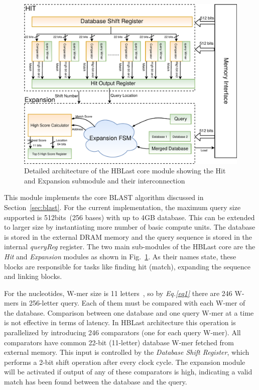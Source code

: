 \begin{figure}[t!]
\centering
\includegraphics[width=\columnwidth]{Figures/BlastMachine.pdf}
\caption{Detailed architecture of the HBLast core module showing the Hit and Expansion submodule and their interconnection} \label{fig:blastArch}
\end{figure}

This module implements the core BLAST algorithm discussed in Section~\ref{sec:blast}.
For the current implementation, the maximum query size supported is 512bits~(256 bases) with up to 4GB database. 
This can be extended to larger size by instantiating more number of basic compute units.
The database is stored in the external DRAM memory and the query sequence is stored in the internal \textit{queryReg} register.
The two main sub-modules of the HBLast core are the \textit{Hit} and \textit{Expansion} modules as shown in Fig.~\ref{fig:blastArch}. As their names state, these blocks are responsible for tasks like finding hit (match), expanding the sequence and linking blocks. 

For the nucleotides, W-mer size is 11 letters~\cite{kasap2008design}, so by \textit{Eq.\ref{eq1}} there are 246 W-mers in 256-letter query. 
Each of them must be compared with each W-mer of the database.  
Comparison between one database and one query W-mer at a time is not effective in terms of latency. 
In HBLast architecture this operation is parallelized by introducing 246 comparators (one for each query W-mer). 
All comparators have common 22-bit (11-letter) database W-mer fetched from external memory. 
This input is controlled by the \textit{Database Shift Register}, which performs a 2-bit shift operation after every clock cycle. 
The expansion module will be activated if output of any of these comparators is high, indicating a valid match has been found between the database and the query. 

